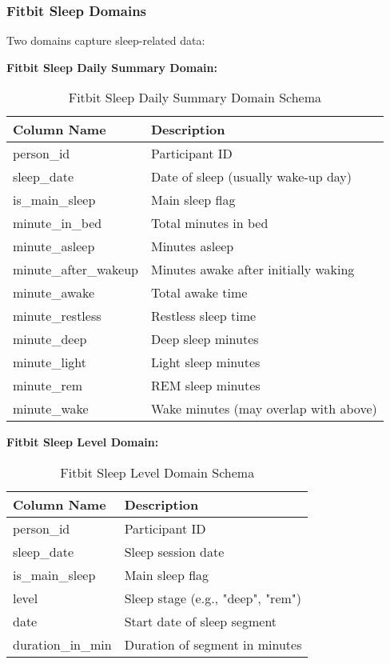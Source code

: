 \documentclass[12pt]{article}
\begin{document}
\subsubsection{Fitbit Sleep Domains}
Two domains capture sleep-related data:

\textbf{Fitbit Sleep Daily Summary Domain:}
\begin{table}[h]
\centering
\begin{tabular}{|l|l|}
\hline
\textbf{Column Name} & \textbf{Description} \\
\hline
person\_id & Participant ID \\
sleep\_date & Date of sleep (usually wake-up day) \\
is\_main\_sleep & Main sleep flag \\
minute\_in\_bed & Total minutes in bed \\
minute\_asleep & Minutes asleep \\
minute\_after\_wakeup & Minutes awake after initially waking \\
minute\_awake & Total awake time \\
minute\_restless & Restless sleep time \\
minute\_deep & Deep sleep minutes \\
minute\_light & Light sleep minutes \\
minute\_rem & REM sleep minutes \\
minute\_wake & Wake minutes (may overlap with above) \\
\hline
\end{tabular}
\caption{Fitbit Sleep Daily Summary Domain Schema}
\end{table}

\textbf{Fitbit Sleep Level Domain:}
\begin{table}[h]
\centering
\begin{tabular}{|l|l|}
\hline
\textbf{Column Name} & \textbf{Description} \\
\hline
person\_id & Participant ID \\
sleep\_date & Sleep session date \\
is\_main\_sleep & Main sleep flag \\
level & Sleep stage (e.g., "deep", "rem") \\
date & Start date of sleep segment \\
duration\_in\_min & Duration of segment in minutes \\
\hline
\end{tabular}
\caption{Fitbit Sleep Level Domain Schema}
\end{table}
\end{document}
